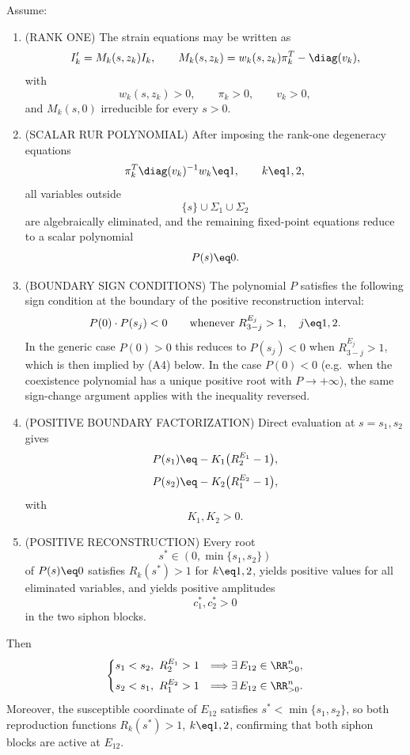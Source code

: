 Assume:
\begin{enumerate}[label=\textup{(A\arabic*)},
                  align=left, leftmargin=*, labelindent=0pt]

\item\label{A:rankone}\textup{(RANK ONE)}
The strain equations may be written as
\[
        I_k'=M_k(s,z_k)I_k,
        \qquad
        M_k(s,z_k)=w_k(s,z_k)\pi_k^T-\diag(v_k),
\]
with
\[
        w_k(s,z_k)>0,
        \qquad
        \pi_k>0,
        \qquad
        v_k>0,
\]
and $M_k(s,0)$ irreducible for every $s>0$.

\item\label{A:RUR}\textup{(SCALAR RUR POLYNOMIAL)}
After imposing the rank-one degeneracy equations
\[
        \pi_k^T\diag(v_k)^{-1}w_k\eq1,
        \qquad k\eq1,2,
\]
all variables outside
\[
        \{s\}\cup\Sigma_1\cup\Sigma_2
\]
are algebraically eliminated, and the remaining fixed-point equations
reduce to a scalar polynomial
\[
        P(s)\eq0.
\]

\item\label{A:norm}\textup{(BOUNDARY SIGN CONDITIONS)}
The polynomial $P$ satisfies the following sign condition at the
boundary of the positive reconstruction interval:
\[
        P(0)\cdot P(s_j) < 0
        \qquad
        \text{whenever } R_{3-j}^{E_j}>1,\quad j\eq1,2.
\]
In the generic case $P(0)>0$ this reduces to $P(s_j)<0$ when
$R_{3-j}^{E_j}>1$, which is then implied by \textup{(A4)} below.
In the case $P(0)<0$ (e.g.\ when the coexistence polynomial has a
unique positive root with $P\to+\infty$), the same sign-change
argument applies with the inequality reversed.

\item\label{A:factor}\textup{(POSITIVE BOUNDARY FACTORIZATION)}
Direct evaluation at $s=s_1,s_2$ gives
\[
        P(s_1)
        \eq
        -K_1\bigl(R_2^{E_1}-1\bigr),
\]
\[
        P(s_2)
        \eq
        -K_2\bigl(R_1^{E_2}-1\bigr),
\]
with
\[
        K_1,K_2>0.
\]

\item\label{A:recon}\textup{(POSITIVE RECONSTRUCTION)}
Every root
\[
        s^*\in(0,\min\{s_1,s_2\})
\]
of $P(s)\eq0$ satisfies $R_k(s^*)>1$ for $k\eq1,2$, yields positive
values for all eliminated variables, and yields positive amplitudes
\[
        c_1^*,c_2^*>0
\]
in the two siphon blocks.

\end{enumerate}

Then
\[
\begin{cases}
s_1<s_2,\ R_2^{E_1}>1
&\Longrightarrow
\exists\,E_{12}\in\RR^n_{>0},
\\[1ex]
s_2<s_1,\ R_1^{E_2}>1
&\Longrightarrow
\exists\,E_{12}\in\RR^n_{>0}.
\end{cases}
\]
Moreover, the susceptible coordinate of $E_{12}$ satisfies
$s^*<\min\{s_1,s_2\}$, so both reproduction functions
$R_k(s^*)>1$, $k\eq1,2$, confirming that both siphon blocks are
active at $E_{12}$.
\eeT

